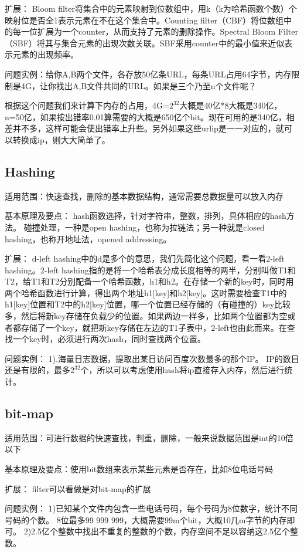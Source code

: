扩展：
Bloom filter将集合中的元素映射到位数组中，用k（k为哈希函数个数）个映射位是否全1表示元素在不在这个集合中。Counting  filter（CBF）将位数组中的每一位扩展为一个counter，从而支持了元素的删除操作。Spectral 
Bloom Filter（SBF）将其与集合元素的出现次数关联。SBF采用counter中的最小值来近似表示元素的出现频率。

问题实例：给你A,B两个文件，各存放50亿条URL，每条URL占用64字节，内存限制是4G，让你找出A,B文件共同的URL。如果是三个乃至n个文件呢？

根据这个问题我们来计算下内存的占用，4G=$2^32$大概是40亿*8大概是340亿，n=50亿，如果按出错率0.01算需要的大概是650亿个bit。现在可用的是340亿，相差并不多，这样可能会使出错率上升些。另外如果这些urlip是一一对应的，就可以转换成ip，则大大简单了。

\subsection{Hashing}
适用范围：快速查找，删除的基本数据结构，通常需要总数据量可以放入内存

基本原理及要点：
hash函数选择，针对字符串，整数，排列，具体相应的hash方法。
碰撞处理，一种是open hashing，也称为拉链法；另一种就是closed hashing，也称开地址法，opened addressing。

扩展：
d-left hashing中的d是多个的意思，我们先简化这个问题，看一看2-left hashing。2-left 
hashing指的是将一个哈希表分成长度相等的两半，分别叫做T1和T2，给T1和T2分别配备一个哈希函数，h1和h2。在存储一个新的key时，同时用两个哈希函数进行计算，得出两个地址h1[key]和h2[key]。这时需要检查T1中的h1[key]位置和T2中的h2[key]位置，哪一个位置已经存储的（有碰撞的）key比较多，然后将新key存储在负载少的位置。如果两边一样多，比如两个位置都为空或者都存储了一个key，就把新key存储在左边的T1子表中，2-left也由此而来。在查找一个key时，必须进行两次hash，同时查找两个位置。

问题实例：
1).海量日志数据，提取出某日访问百度次数最多的那个IP。
IP的数目还是有限的，最多$2^32$个，所以可以考虑使用hash将ip直接存入内存，然后进行统计。

\subsection{bit-map}
适用范围：可进行数据的快速查找，判重，删除，一般来说数据范围是int的10倍以下

基本原理及要点：使用bit数组来表示某些元素是否存在，比如8位电话号码

扩展： filter可以看做是对bit-map的扩展

问题实例：
1)已知某个文件内包含一些电话号码，每个号码为8位数字，统计不同号码的个数。
8位最多99 999 999，大概需要99m个bit，大概10几m字节的内存即可。
2)2.5亿个整数中找出不重复的整数的个数，内存空间不足以容纳这2.5亿个整数。

